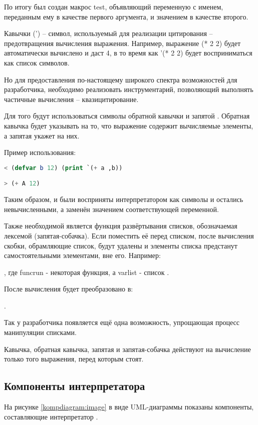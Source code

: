 По итогу был создан макрос test, объявляющий переменную с именем, переданным ему в качестве первого аргумента, и значением в качестве второго.

Кавычки (') -- символ, используемый для реализации цитирования -- предотвращения вычисления выражения. Например, выражение (* 2 2) будет автоматически вычислено и даст 4, в то время как '(* 2 2) будет восприниматься как список символов.

Но для предоставления по-настоящему широкого спектра возможностей для разработчика, необходимо реализовать инструментарий, позволяющий выполнять частичные вычисления -- квазицитирование.

Для того будут использоваться символы обратной кавычки  и запятой \quotes{,}. Обратная кавычка будет указывать на то, что выражение содержит вычисляемые элементы, а запятая укажет на них.

Пример использования:
\begin{lstlisting}[language=Lisp, frame=none]
< (defvar b 12) (print `(+ a ,b))

> (+ A 12)
\end{lstlisting}

Таким образом, \quotes{+} и  были восприняты интерпретатором как символы и остались невычисленными, а  заменён значением соответствующей переменной.

Также необходимой является функция развёртывания списков, обозначаемая лексемой  (запятая-собачка). Если поместить её перед списком, после вычисления скобки, обрамляющие список, будут удалены и элементы списка предстанут самостоятельными элементами, вне его. Например:

, где funcrun - некоторая функция, а varlist - список .

После вычисления будет преобразовано в:

.

Так у разработчика появляется ещё одна возможность, упрощающая процесс манипуляции списками.

Кавычка, обратная кавычка, запятая и запятая-собачка действуют на вычисление только того выражения, перед которым стоят.

\subsection{Компоненты интерпретатора}

На рисунке \ref{kompdiagram:image} в виде UML-диаграммы показаны компоненты, составляющие интерпретатор \cite{e26}.

